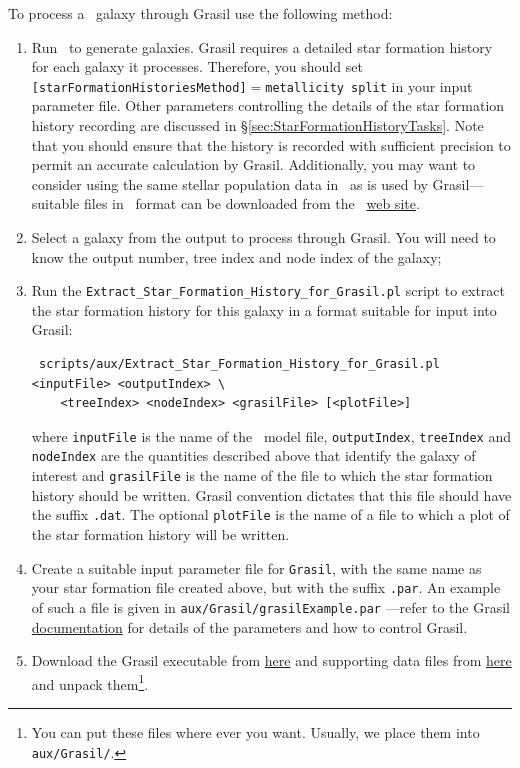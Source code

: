 To process a \glc\ galaxy through {\sc Grasil} use the following method:
\begin{enumerate}
 \item Run \glc\ to generate galaxies. {\sc Grasil} requires a detailed star formation history for each galaxy it processes. Therefore, you should set {\tt [starFormationHistoriesMethod]}$=${\tt metallicity split} in your input parameter file. Other parameters controlling the details of the star formation history recording are discussed in \S\ref{sec:StarFormationHistoryTasks}. Note that you should ensure that the history is recorded with sufficient precision to permit an accurate calculation by {\sc Grasil}. Additionally, you may want to consider using the same stellar population data in \glc\ as is used by {\sc Grasil}---suitable files in \glc\ format can be downloaded from the \glc\ \href{https://sites.google.com/site/galacticusmodel/home/auxiliary-data}{web site}.
 \item Select a galaxy from the output to process through {\sc Grasil}. You will need to know the output number, tree index and node index of the galaxy;
 \item Run the {\tt Extract\_Star\_Formation\_History\_for\_Grasil.pl} script to extract the star formation history for this galaxy in a format suitable for input into {\sc Grasil}:
\begin{verbatim}
 scripts/aux/Extract_Star_Formation_History_for_Grasil.pl <inputFile> <outputIndex> \
    <treeIndex> <nodeIndex> <grasilFile> [<plotFile>]
\end{verbatim}
where {\tt inputFile} is the name of the \glc\ model file, {\tt outputIndex}, {\tt treeIndex} and {\tt nodeIndex} are the quantities described above that identify the galaxy of interest and {\tt grasilFile} is the name of the file to which the star formation history should be written. {\sc Grasil} convention dictates that this file should have the suffix {\tt .dat}. The optional {\tt plotFile} is the name of a file to which a plot of the star formation history will be written.
 \item Create a suitable input parameter file for {\tt Grasil}, with the same name as your star formation file created above, but with the suffix {\tt .par}. An example of such a file is given in {\tt aux/Grasil/grasilExample.par} ---refer to the {\sc Grasil} \href{http://adlibitum.oat.ts.astro.it/silva/grasil/grasil.doc}{documentation} for details of the parameters and how to control {\sc Grasil}. 
 \item Download the {\sc Grasil} executable from \href{http://users.obs.carnegiescience.edu/abenson/galacticus/tools/grasil}{here} and supporting data files from \href{http://adlibitum.oat.ts.astro.it/silva/grasil/download.htm}{here} and unpack them\footnote{You can put these files where ever you want. Usually, we place them into {\tt aux/Grasil/}.}.

\end{enumerate}
